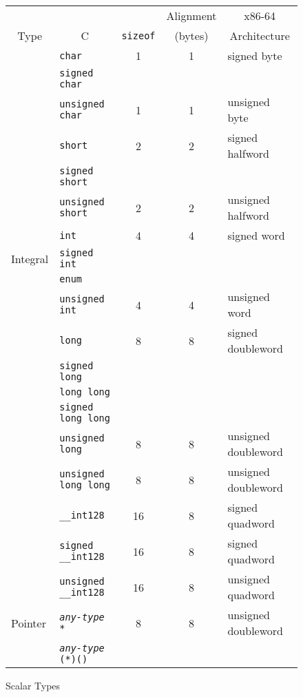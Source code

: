 \begin{figure}
  \caption{Scalar Types}\label{basic-types}
{ %
  \small
  \begin{tabular}{l|l|c|c|l}
    \hline\noalign{\smallskip}
     & &  & \multicolumn{1}{c|}{Alignment} & \multicolumn{1}{c|}{x86-64} \\
    \multicolumn{1}{c|}{Type} & \multicolumn{1}{c|}{C}
     &  \texttt{sizeof} & (bytes)   
     & \multicolumn{1}{c|}{Architecture}  \\
    \hline
    & \texttt{char}        & 1 & 1 & signed byte \\
    & \texttt{signed char} & & \\
    \cline{2-5}
    & \texttt{unsigned char} & 1 & 1 & unsigned byte \\
    \cline{2-5}
    & \texttt{short} & 2 & 2 & signed halfword \\
    & \texttt{signed short} & & \\
    \cline{2-5}
    & \texttt{unsigned short} & 2 & 2 & unsigned halfword \\
    \cline{2-5}
    & \texttt{int} & 4 & 4 & signed word \\
    Integral & \texttt{signed int} & & \\
    & \texttt{enum} & & \\
    \cline{2-5}
    & \texttt{unsigned int} & 4 & 4 & unsigned word \\
    \cline{2-5}
    & \texttt{long} & 8 & 8 & signed doubleword \\
    & \texttt{signed long} & & \\
    & \texttt{long long} & & \\
    & \texttt{signed long long} & & \\
    \cline{2-5}
    & \texttt{unsigned long} & 8 & 8 & unsigned doubleword \\
    & \texttt{unsigned long long} & 8 & 8 & unsigned doubleword \\
    \hline
    & \texttt{__int128} & 16 & 8 & signed quadword \\
    & \texttt{signed __int128} & 16 & 8 & signed quadword \\
    \hline
    & \texttt{unsigned __int128} & 16 & 8 & unsigned quadword \\
    \hline
    Pointer & \texttt{\textit{any-type} *} & 8 & 8 & unsigned doubleword \\
    & \texttt{\textit{any-type} (*)()} & & \\

\end{tabular}}
\end{figure}
